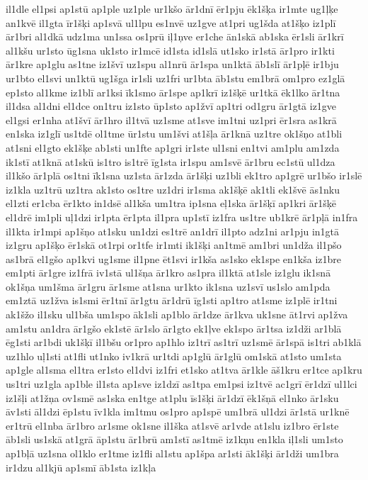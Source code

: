 {il1dle
el1psi
ap1stū
ap1ple
uz1ple
ur1kšo
ār1dnī
ēr1pju
ēk1šķa
ir1mte
ug1ļķe
an1kvē
il1gta
īr1šķi
ap1svā
ul1lpu
es1nvē
uz1gve
at1pri
ug1šda
at1šķo
iz1plī
ār1bri
al1dkā
udz1ma
un1ssa
os1prū
iļ1ņve
er1che
ān1skā
ab1ska
ēr1sli
ār1krī
al1kšu
ur1sto
ūg1sna
uk1sto
ir1mcē
id1sta
id1slā
ut1sko
ir1stā
ār1pro
ir1kti
ār1kre
ap1glu
as1tne
iz1švī
uz1spu
al1nrū
ār1spa
un1ktā
āb1slī
ār1pļē
ir1bju
ur1bto
el1svi
un1ktū
ug1šga
ir1sli
uz1fri
ur1bta
āb1stu
em1brā
om1pro
ez1glā
ep1sto
al1kme
iz1blī
ar1ksi
īk1smo
ār1spe
ap1krī
iz1šķē
ur1tkā
ēk1lko
ār1tna
il1dsa
al1dni
el1dce
on1tru
iz1sto
ūp1sto
ap1žvī
ap1tri
od1gru
ār1gtā
iz1gve
el1gsi
er1nha
at1švī
ār1hro
il1tvā
uz1sme
at1sve
im1tni
uz1pri
ēr1sra
as1krā
en1ska
iz1glī
us1tdē
ol1tme
ūr1stu
um1švi
at1šļa
ār1knā
uz1tre
ok1šņo
at1bli
at1sni
el1gto
ek1šķe
ab1sti
un1fte
ap1gri
ir1ste
ul1sni
en1tvi
am1plu
am1zda
ik1stī
at1knā
at1skū
is1tro
is1trē
īg1sta
ir1spu
am1svē
ār1bru
ec1stū
ul1dza
il1kšo
ār1plā
os1tni
īk1sna
uz1sta
ār1zda
ār1šķi
uz1bli
ek1tro
ap1grē
ur1bšo
ir1slē
iz1kla
uz1trū
uz1tra
ak1sto
os1tre
uz1dri
ir1sma
ak1šķē
ak1tli
ek1švē
ās1nku
el1zti
er1cba
ēr1kto
in1dsē
al1kša
um1tra
ip1sna
eļ1ska
ār1šķī
ap1kri
ār1šķē
el1drē
im1pli
uļ1dzi
ir1pta
ēr1pta
il1pra
up1stī
iz1fra
us1tre
ub1krē
ār1pļā
in1fra
il1kta
ir1mpi
ap1šņo
at1sku
un1dzi
es1trē
an1drī
il1pto
adz1ni
ar1pju
in1gtā
iz1gru
ap1šķo
ēr1skā
ot1rpi
or1tfe
ir1mti
ik1šķi
an1tmē
am1bri
un1dža
il1pšo
as1brā
el1gšo
ap1kvi
ug1sme
il1pne
ēt1svi
ir1kša
as1sko
ek1spe
en1kša
iz1bre
em1pti
ār1gre
iz1frā
iv1stā
ul1šņa
ār1kro
as1pra
il1ktā
at1sle
iz1glu
ik1snā
ok1šņa
um1šma
ār1gru
ār1sme
at1sna
ur1kto
ik1sna
uz1svī
us1slo
am1pda
em1ztā
uz1žva
is1smi
ēr1tnī
ār1gtu
ār1drū
īg1sti
ap1tro
at1sme
iz1plē
ir1tni
ak1šžo
il1sku
ul1bša
um1spo
āk1sli
ap1blo
ār1dze
ār1kva
uk1sne
āt1rvi
ap1žva
am1stu
an1dra
ār1gšo
ek1stē
ār1slo
ār1gto
ek1ļve
ek1spo
ār1tsa
iz1dži
ar1blā
ēg1sti
ar1bdi
uk1šķī
il1bšu
or1pro
ap1hlo
iz1trī
as1trī
uz1smē
ār1spā
is1tri
ab1klā
uz1hlo
uļ1sti
at1fli
ut1nko
iv1krā
ur1tdi
ap1glū
ār1glū
om1skā
at1sto
um1sta
ap1gle
al1sma
el1tra
er1sto
el1dvi
iz1fri
et1sko
at1tva
ār1kle
āš1kru
er1tce
ap1kru
us1tri
uz1gla
ap1ble
il1sta
ap1sve
iz1dzī
as1tpa
em1psi
iz1tvē
ac1grī
ēr1dzī
ul1lci
iz1šļi
at1žņa
ov1smē
as1ska
en1tge
at1plu
īs1šķi
ār1dzī
ēk1šņā
el1nko
ār1sku
āv1sti
āl1dzi
ēp1stu
īv1kla
im1tmu
os1pro
ap1spē
um1brā
ul1dzi
ār1stā
ur1knē
er1trū
el1nba
ār1bro
ar1sme
ok1sne
il1ška
at1svē
ar1vde
at1slu
iz1bro
ēr1ste
āb1sli
us1skā
at1grā
āp1stu
ār1brū
am1stī
as1tmē
iz1kņu
en1kla
iļ1sli
um1sto
ap1bļā
uz1sna
ol1klo
er1tme
iz1fli
al1stu
ap1špa
ar1sti
āk1šķi
ār1dži
um1bra
ir1dzu
al1kjū
ap1smī
āb1sta
iz1kļa
}
